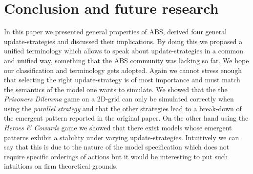 \section{Conclusion and future research}
In this paper we presented general properties of ABS, derived four general update-strategies and discussed their implications. By doing this we proposed a unified terminology which allows to speak about update-strategies in a common and unified way, something that the ABS community was lacking so far. We hope our classification and terminology gets adopted. Again we cannot stress enough that selecting the right update-strategy is of most importance and must match the semantics of the model one wants to simulate.
We showed that the the \textit{Prisoners Dilemma} game on a 2D-grid can only be simulated correctly when using the \textit{parallel strategy} and that the other strategies lead to a break-down of the emergent pattern reported in the original paper. On the other hand using the \textit{Heroes \& Cowards} game we showed that there exist models whose emergent patterns exhibit a stability under varying update-strategies. Intuitively we can say that this is due to the nature of the model specification which does not require specific orderings of actions but it would be interesting to put such intuitions on firm theoretical grounds.